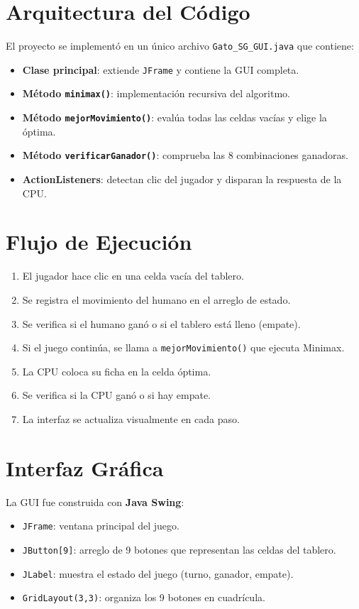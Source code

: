 \documentclass[12pt,a4paper]{article}
\begin{document}
\section{Arquitectura del Código}

El proyecto se implementó en un único archivo \texttt{Gato\_SG\_GUI.java} que contiene:

\begin{itemize}
  \item \textbf{Clase principal}: extiende \texttt{JFrame} y contiene la GUI completa.
  \item \textbf{Método \texttt{minimax()}}: implementación recursiva del algoritmo.
  \item \textbf{Método \texttt{mejorMovimiento()}}: evalúa todas las celdas vacías y elige la óptima.
  \item \textbf{Método \texttt{verificarGanador()}}: comprueba las 8 combinaciones ganadoras.
  \item \textbf{ActionListeners}: detectan clic del jugador y disparan la respuesta de la CPU.
\end{itemize}

\section{Flujo de Ejecución}

\begin{enumerate}
  \item El jugador hace clic en una celda vacía del tablero.
  \item Se registra el movimiento del humano en el arreglo de estado.
  \item Se verifica si el humano ganó o si el tablero está lleno (empate).
  \item Si el juego continúa, se llama a \texttt{mejorMovimiento()} que ejecuta Minimax.
  \item La CPU coloca su ficha en la celda óptima.
  \item Se verifica si la CPU ganó o si hay empate.
  \item La interfaz se actualiza visualmente en cada paso.
\end{enumerate}

\section{Interfaz Gráfica}

La GUI fue construida con \textbf{Java Swing}:
\begin{itemize}
  \item \texttt{JFrame}: ventana principal del juego.
  \item \texttt{JButton[9]}: arreglo de 9 botones que representan las celdas del tablero.
  \item \texttt{JLabel}: muestra el estado del juego (turno, ganador, empate).
  \item \texttt{GridLayout(3,3)}: organiza los 9 botones en cuadrícula.
\end{itemize}
\end{document}
